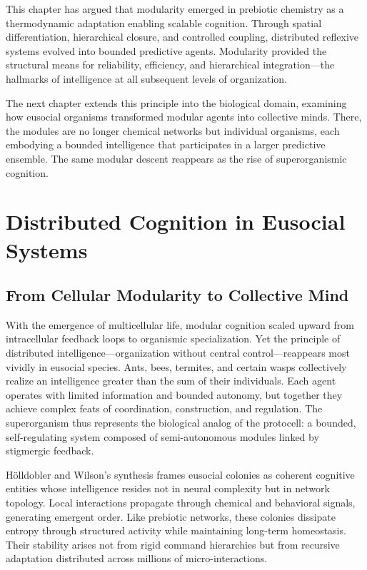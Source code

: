 \documentclass[11pt,a4paper]{article}
\begin{document}
This chapter has argued that modularity emerged in prebiotic chemistry as a thermodynamic adaptation enabling scalable cognition.  Through spatial differentiation, hierarchical closure, and controlled coupling, distributed reflexive systems evolved into bounded predictive agents.  Modularity provided the structural means for reliability, efficiency, and hierarchical integration—the hallmarks of intelligence at all subsequent levels of organization.

The next chapter extends this principle into the biological domain, examining how eusocial organisms transformed modular agents into collective minds.  There, the modules are no longer chemical networks but individual organisms, each embodying a bounded intelligence that participates in a larger predictive ensemble.  The same modular descent reappears as the rise of superorganismic cognition.


\section{Distributed Cognition in Eusocial Systems}
\label{sec:eusocial}

\subsection{From Cellular Modularity to Collective Mind}

With the emergence of multicellular life, modular cognition scaled upward from intracellular feedback loops to organismic specialization.  Yet the principle of distributed intelligence—organization without central control—reappears most vividly in eusocial species.  Ants, bees, termites, and certain wasps collectively realize an intelligence greater than the sum of their individuals.  Each agent operates with limited information and bounded autonomy, but together they achieve complex feats of coordination, construction, and regulation.  The superorganism thus represents the biological analog of the protocell: a bounded, self-regulating system composed of semi-autonomous modules linked by stigmergic feedback.  

Hölldobler and Wilson’s synthesis \citep{HolldoblerWilson2009Superorganism} frames eusocial colonies as coherent cognitive entities whose intelligence resides not in neural complexity but in network topology.  Local interactions propagate through chemical and behavioral signals, generating emergent order.  Like prebiotic networks, these colonies dissipate entropy through structured activity while maintaining long-term homeostasis.  Their stability arises not from rigid command hierarchies but from recursive adaptation distributed across millions of micro-interactions.
\end{document}
